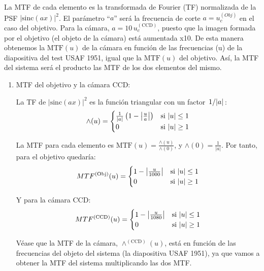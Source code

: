\documentclass{./packages/optica-article}
\newcommand{\sinc}{\textrm{sinc}}
\newcommand\MTF{\textrm{MTF}}
\begin{document}
\begin{enumerate}
		La MTF de cada elemento es la transformada de Fourier (TF) normalizada de la PSF $|\sinc(ax)|^2$. El parámetro ``$a$'' será la frecuencia de corte $a=u_c^{(Obj)}$ en el caso del objetivo. Para la cámara, $a=10\, u_c^{(\textrm{CCD})}$, puesto que la imagen formada por el objetivo (el objeto de la cámara) está aumentada x10. De esta manera obtenemos la $\MTF(u)$ de la cámara en función de las frecuencias (u) de la diapositiva del test USAF 1951, igual que la $\MTF(u)$ del objetivo. Así, la MTF del sistema será el producto las MTF de los dos elementos del mismo.

		\begin{enumerate}
		    \item MTF del objetivo y la cámara CCD:

		    La TF de $|\sinc(ax)|^2$ es la función triangular con un factor $\flatfrac{1}{|a|}$:
    		  \begin{equation}
    		        \wedge(u)=
		        \begin{cases}
		        \frac{1}{|a|}\left(1-\abs{\frac{u}{a}}\right)   &\textrm{si   $|u| \leq 1$} \\
                 0   &\textrm{si  $|u| \geq 1$}
		        \end{cases}
		    \end{equation}

		    La MTF para cada elemento es $\MTF(u) = \frac{\wedge(u)}{\wedge(0)}$, y $\wedge(0) = \frac{1}{|a|}$. Por tanto, para el objetivo quedaría:
		        \begin{equation}
    		       MTF^{(\textrm{Obj})}(u)=
		       \begin{cases}
                     1-\abs{\frac{u}{1000}} &\textrm{si   $|u| \leq 1$}  \\
					0   &\textrm{si  $|u| \geq 1$}
                     \end{cases}
		    \end{equation}

		    Y para la cámara CCD:
		    	\begin{equation}
    		       MTF^{(\textrm{CCD})}(u)=
		       \begin{cases}
                     1-\abs{\frac{u}{1080}} &\textrm{si   $|u| \leq 1$} \\
                     0   &\textrm{si  $|u| \geq 1$}
               \end{cases}
		    \end{equation}

		    Véase que la MTF de la cámara, $\wedge^{(\textrm{CCD})}(u)$, está en función de las frecuencias del objeto del sistema (la diapositiva USAF 1951), ya que vamos a obtener la MTF del sistema multiplicando las dos MTF.



\end{enumerate}
\end{enumerate}
\end{document}
